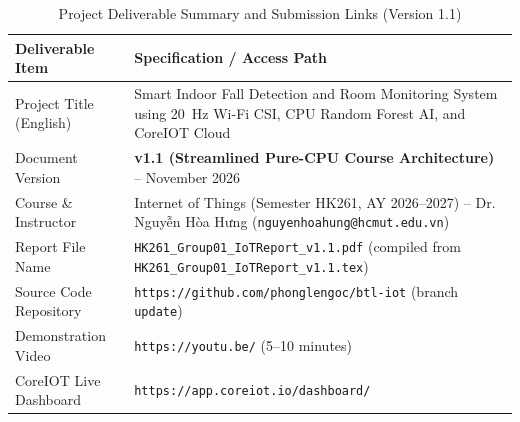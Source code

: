 \documentclass{hcmut-report}
\begin{document}
\begin{table}[H]
\centering
\caption{Project Deliverable Summary and Submission Links (Version 1.1)}
\label{tab:submission_info}
\small
\begin{tabularx}{\textwidth}{|P{4.2cm}|Y|}
\hline
\textbf{Deliverable Item} & \textbf{Specification / Access Path} \\
\hline
Project Title (English) & Smart Indoor Fall Detection and Room Monitoring System using 20~Hz Wi-Fi CSI, CPU Random Forest AI, and CoreIOT Cloud \\
\hline
Document Version & \textbf{v1.1 (Streamlined Pure-CPU Course Architecture)} -- November 2026 \\
\hline
Course \& Instructor & Internet of Things (Semester HK261, AY 2026--2027) -- Dr. Nguyễn Hòa Hưng (\texttt{nguyenhoahung@hcmut.edu.vn}) \\
\hline
Report File Name & \texttt{HK261\_Group01\_IoTReport\_v1.1.pdf} (compiled from \texttt{HK261\_Group01\_IoTReport\_v1.1.tex}) \\
\hline
Source Code Repository & \texttt{https://github.com/\allowbreak phonglengoc/\allowbreak btl-iot} (branch \texttt{update}) \\
\hline
Demonstration Video & \texttt{https://youtu.be/} (5--10 minutes) \\
\hline
CoreIOT Live Dashboard & \texttt{https://app.coreiot.io/\allowbreak dashboard/} \\
\hline
\end{tabularx}
\end{table}
\end{document}
